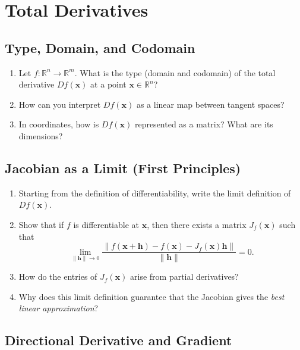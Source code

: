 \section{Total Derivatives}

\subsection{Type, Domain, and Codomain}

\begin{enumerate}
  \item Let $f : \mathbb{R}^n \to \mathbb{R}^m$. What is the type (domain and codomain) of the total derivative $Df(\mathbf{x})$ at a point $\mathbf{x} \in \mathbb{R}^n$?
  \item How can you interpret $Df(\mathbf{x})$ as a linear map between tangent spaces?
  \item In coordinates, how is $Df(\mathbf{x})$ represented as a matrix? What are its dimensions?
\end{enumerate}

\subsection{Jacobian as a Limit (First Principles)}

\begin{enumerate}[resume]
  \item Starting from the definition of differentiability, write the limit definition of $Df(\mathbf{x})$.
  \item Show that if $f$ is differentiable at $\mathbf{x}$, then there exists a matrix $J_f(\mathbf{x})$ such that
    \[
      \lim_{\|\mathbf{h}\| \to 0} \frac{\|f(\mathbf{x}+\mathbf{h}) - f(\mathbf{x}) - J_f(\mathbf{x})\mathbf{h}\|}{\|\mathbf{h}\|} = 0.
    \]
  \item How do the entries of $J_f(\mathbf{x})$ arise from partial derivatives?
  \item Why does this limit definition guarantee that the Jacobian gives the \emph{best linear approximation}?
\end{enumerate}

\subsection{Directional Derivative and Gradient}


